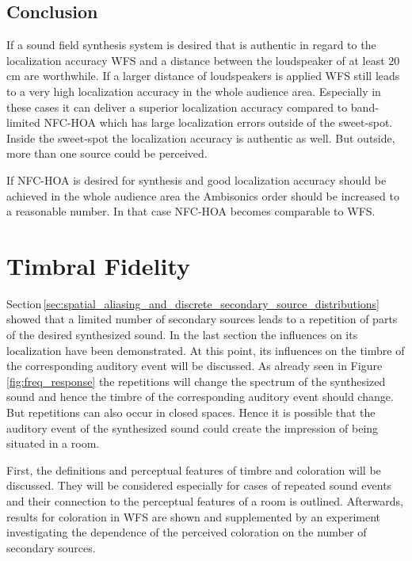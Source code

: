 \subsection{Conclusion}
\label{sec:localization_conclusion}
%
If a sound field synthesis system is desired that is authentic in regard to the
localization accuracy \ac{WFS} and a
distance between the loudspeaker of at least $20$\,cm are worthwhile.
If a larger distance of loudspeakers is applied \ac{WFS} still leads to a very
high localization accuracy in the whole audience area. Especially in these cases
it can deliver a superior localization accuracy compared to band-limited
\ac{NFC-HOA} which has large localization errors outside of the sweet-spot.
Inside the sweet-spot the localization accuracy is authentic as well.
But outside, more than one source could be perceived. 

If \ac{NFC-HOA} is desired for synthesis and good localization
accuracy should be achieved in the whole audience area the Ambisonics order
should be increased to a reasonable number. In that case
\ac{NFC-HOA} becomes comparable to \ac{WFS}.



\section[Timbral Fidelity]{Timbral Fidelity\autocite[The part discussing literature results for
\ac{WFS} was published in a slightly modified way in][the presented experiment was carried
out in coorperation with Christoph Hohnerlein as part of his Bachelor
thesis]{Spors2013a}}
\label{sec:timbral_fidelity}

Section\,\ref{sec:spatial_aliasing_and_discrete_secondary_source_distributions}
showed that a limited number of secondary sources leads to a repetition of parts
of the desired synthesized sound. In the last section the
influences on its localization have been demonstrated. At this point, its influences on the
timbre of the corresponding auditory event will be discussed. As already seen in
Figure\,\ref{fig:freq_response} the repetitions will change the spectrum of the
synthesized sound and hence the timbre of the corresponding auditory event
should change. But repetitions can also occur in closed spaces.
Hence it is possible that the auditory event of the
synthesized sound could create the impression of being situated in a room.

First, the definitions and perceptual features of timbre and coloration
will be discussed. They will be considered especially for cases of repeated sound
events and their connection to the perceptual features of a room is outlined.
Afterwards, results for coloration in \ac{WFS} are shown and supplemented by
an experiment investigating the dependence of the perceived coloration
on the number of secondary sources.

